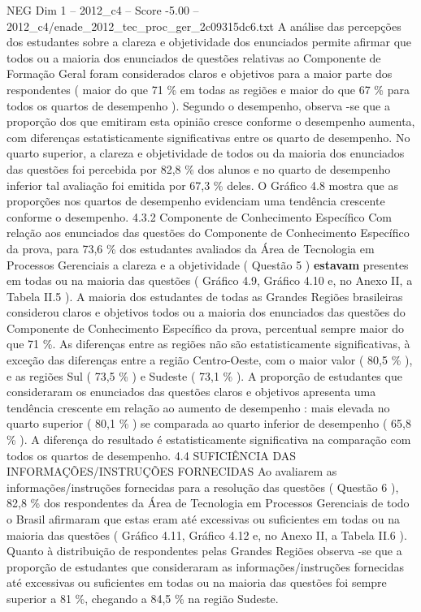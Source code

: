 \begin{textsample}{NEG Dim 1 – 2012\_c4 – Score -5.00 – 2012\_c4/enade\_2012\_tec\_proc\_ger\_2c09315dc6.txt}
A análise das percepções dos estudantes sobre a clareza e objetividade dos enunciados permite afirmar que todos ou a maioria dos enunciados de questões relativas ao Componente de Formação Geral foram considerados claros e objetivos para a maior parte dos respondentes ( maior do que 71 \% em todas as regiões e maior do que 67 \% para todos os quartos de desempenho ).
Segundo o desempenho, observa -se que a proporção dos que emitiram esta opinião cresce conforme o desempenho aumenta, com diferenças estatisticamente significativas entre os quarto de desempenho.
No quarto superior, a clareza e objetividade de todos ou da maioria dos enunciados das questões foi percebida por 82,8 \% dos alunos e no quarto de desempenho inferior tal avaliação foi emitida por 67,3 \% deles.
O Gráfico 4.8 mostra que as proporções nos quartos de desempenho evidenciam uma tendência crescente conforme o desempenho. 4.3.2 Componente de Conhecimento Específico Com relação aos enunciados das questões do Componente de Conhecimento Específico da prova, para 73,6 \% dos estudantes avaliados da Área de Tecnologia em Processos Gerenciais a clareza e a objetividade ( Questão 5 ) \textbf{estavam} presentes em todas ou na maioria das questões ( Gráfico 4.9, Gráfico 4.10 e, no Anexo II, a Tabela II.5 ).
A maioria dos estudantes de todas as Grandes Regiões brasileiras considerou claros e objetivos todos ou a maioria dos enunciados das questões do Componente de Conhecimento Específico da prova, percentual sempre maior do que 71 \%.
As diferenças entre as regiões não são estatisticamente significativas, à exceção das diferenças entre a região Centro-Oeste, com o maior valor ( 80,5 \% ), e as regiões Sul ( 73,5 \% ) e Sudeste ( 73,1 \% ).
A proporção de estudantes que consideraram os enunciados das questões claros e objetivos apresenta uma tendência crescente em relação ao aumento de desempenho : mais elevada no quarto superior ( 80,1 \% ) se comparada ao quarto inferior de desempenho ( 65,8 \% ).
A diferença do resultado é estatisticamente significativa na comparação com todos os quartos de desempenho. 4.4 SUFICIÊNCIA DAS INFORMAÇÕES/INSTRUÇÕES FORNECIDAS Ao avaliarem as informações/instruções fornecidas para a resolução das questões ( Questão 6 ), 82,8 \% dos respondentes da Área de Tecnologia em Processos Gerenciais de todo o Brasil afirmaram que estas eram até excessivas ou suficientes em todas ou na maioria das questões ( Gráfico 4.11, Gráfico 4.12 e, no Anexo II, a Tabela II.6 ).
Quanto à distribuição de respondentes pelas Grandes Regiões observa -se que a proporção de estudantes que consideraram as informações/instruções fornecidas até excessivas ou suficientes em todas ou na maioria das questões foi sempre superior a 81 \%, chegando a 84,5 \% na região Sudeste.

\end{textsample}
